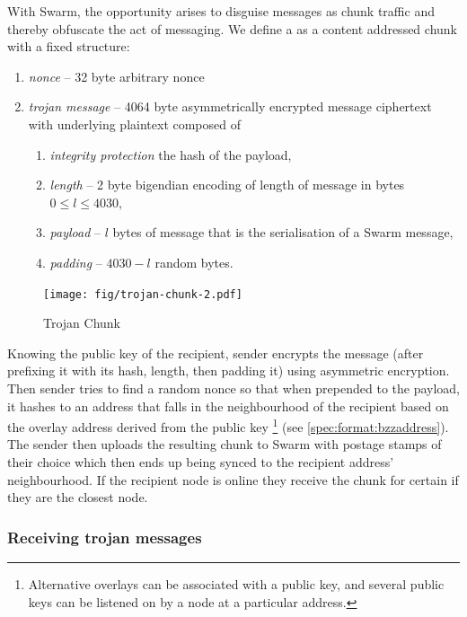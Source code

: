 With Swarm, the opportunity arises to disguise messages as chunk traffic and thereby obfuscate the act of messaging. We define a  as a content addressed chunk with a fixed structure:

\begin{enumerate}
    \item \emph{nonce} -- 32 byte arbitrary nonce 
    \item \emph{trojan message} -- 4064 byte asymmetrically encrypted message ciphertext with underlying plaintext composed of
    \begin{enumerate}
        \item \emph{integrity protection} the hash of the payload, 
        \item \emph{length} -- 2 byte bigendian encoding of length of message in bytes $0\leq l\leq 4030$,
        \item \emph{payload} -- $l$ bytes of message that is the serialisation of a Swarm message,
        \item \emph{padding} -- $4030-l$ random bytes.
    \end{enumerate}
\end{enumerate}

\begin{figure}[htbp]
\centering
\texttt{[image: fig/trojan-chunk-2.pdf]}
\caption[Trojan Chunk\statusyellow]{Trojan Chunk}
\label{fig:trojan-chunk}
\end{figure}

Knowing the public key of the recipient, sender encrypts the message (after prefixing it with its hash, length, then padding it) using asymmetric encryption. Then sender tries to find a random nonce so that when prepended to the payload, it hashes to an address that falls in the neighbourhood of the recipient based on the overlay address derived from the public key%
%
\footnote{Alternative overlays can be associated with a public key, and several public keys can be listened on by a node at a particular address.}
%
(see \ref{spec:format:bzzaddress}). The sender then uploads the resulting chunk to Swarm with postage stamps of their choice which then ends up being synced to the recipient address' neighbourhood. If the recipient node is online they receive the chunk for certain if they are the closest node. 

\subsubsection{Receiving trojan messages}

